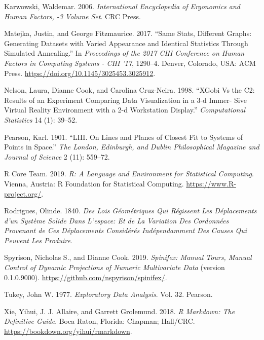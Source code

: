 \documentclass[
  11,
]{article}
\begin{document}
\leavevmode\hypertarget{ref-karwowski_international_2006}{}%
Karwowski, Waldemar. 2006. \emph{International Encyclopedia of Ergonomics and Human Factors, -3 Volume Set}. CRC Press.

\leavevmode\hypertarget{ref-matejka_same_2017}{}%
Matejka, Justin, and George Fitzmaurice. 2017. ``Same Stats, Different Graphs: Generating Datasets with Varied Appearance and Identical Statistics Through Simulated Annealing.'' In \emph{Proceedings of the 2017 CHI Conference on Human Factors in Computing Systems - CHI '17}, 1290--4. Denver, Colorado, USA: ACM Press. \url{https://doi.org/10.1145/3025453.3025912}.

\leavevmode\hypertarget{ref-nelson_xgobi_1998}{}%
Nelson, Laura, Dianne Cook, and Carolina Cruz-Neira. 1998. ``XGobi Vs the C2: Results of an Experiment Comparing Data Visualization in a 3-d Immer- Sive Virtual Reality Environment with a 2-d Workstation Display.'' \emph{Computational Statistics} 14 (1): 39--52.

\leavevmode\hypertarget{ref-pearson_liii._1901}{}%
Pearson, Karl. 1901. ``LIII. On Lines and Planes of Closest Fit to Systems of Points in Space.'' \emph{The London, Edinburgh, and Dublin Philosophical Magazine and Journal of Science} 2 (11): 559--72.

\leavevmode\hypertarget{ref-r_core_team_r:_2019}{}%
R Core Team. 2019. \emph{R: A Language and Environment for Statistical Computing}. Vienna, Austria: R Foundation for Statistical Computing. \url{https://www.R-project.org/}.

\leavevmode\hypertarget{ref-rodrigues_lois_1840}{}%
Rodrigues, Olinde. 1840. \emph{Des Lois Géométriques Qui Régissent Les Déplacements d'un Système Solide Dans L'espace: Et de La Variation Des Cordonnées Provenant de Ces Déplacements Considérés Indépendamment Des Causes Qui Peuvent Les Produire}.

\leavevmode\hypertarget{ref-spyrison_spinifex_2019}{}%
Spyrison, Nicholas S., and Dianne Cook. 2019. \emph{Spinifex: Manual Tours, Manual Control of Dynamic Projections of Numeric Multivariate Data} (version 0.1.0.9000). \url{https://github.com/nspyrison/spinifex/}.

\leavevmode\hypertarget{ref-tukey_exploratory_1977}{}%
Tukey, John W. 1977. \emph{Exploratory Data Analysis}. Vol. 32. Pearson.

\leavevmode\hypertarget{ref-xie_r_2018}{}%
Xie, Yihui, J. J. Allaire, and Garrett Grolemund. 2018. \emph{R Markdown: The Definitive Guide}. Boca Raton, Florida: Chapman; Hall/CRC. \url{https://bookdown.org/yihui/rmarkdown}.
\end{document}
